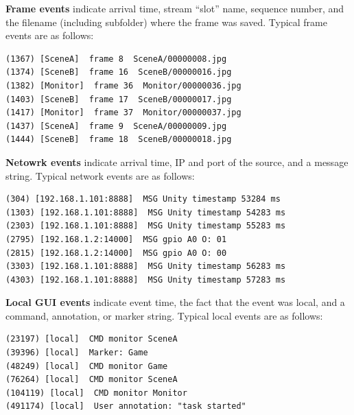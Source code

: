 \textbf{Frame events} indicate arrival time, stream ``slot'' name, sequence 
number, and the filename (including subfolder) where the frame was saved. 
Typical frame events are as follows:
\begin{verbatim}
(1367) [SceneA]  frame 8  SceneA/00000008.jpg
(1374) [SceneB]  frame 16  SceneB/00000016.jpg
(1382) [Monitor]  frame 36  Monitor/00000036.jpg
(1403) [SceneB]  frame 17  SceneB/00000017.jpg
(1417) [Monitor]  frame 37  Monitor/00000037.jpg
(1437) [SceneA]  frame 9  SceneA/00000009.jpg
(1444) [SceneB]  frame 18  SceneB/00000018.jpg
\end{verbatim}

\textbf{Netowrk events} indicate arrival time, IP and port of the source,
and a message string. Typical network events are as follows:
\begin{verbatim}
(304) [192.168.1.101:8888]  MSG Unity timestamp 53284 ms
(1303) [192.168.1.101:8888]  MSG Unity timestamp 54283 ms
(2303) [192.168.1.101:8888]  MSG Unity timestamp 55283 ms
(2795) [192.168.1.2:14000]  MSG gpio A0 O: 01
(2815) [192.168.1.2:14000]  MSG gpio A0 O: 00
(3303) [192.168.1.101:8888]  MSG Unity timestamp 56283 ms
(4303) [192.168.1.101:8888]  MSG Unity timestamp 57283 ms
\end{verbatim}

\textbf{Local GUI events} indicate event time, the fact that the event was
local, and a command, annotation, or marker string. Typical local events
are as follows:
\begin{verbatim}
(23197) [local]  CMD monitor SceneA
(39396) [local]  Marker: Game
(48249) [local]  CMD monitor Game
(76264) [local]  CMD monitor SceneA
(104119) [local]  CMD monitor Monitor
(491174) [local]  User annotation: "task started"
\end{verbatim}

%
